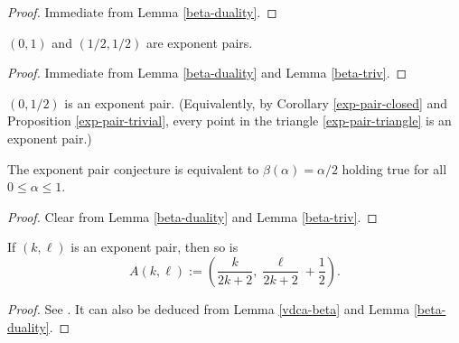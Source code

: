 \begin{proof} Immediate from Lemma \ref{beta-duality}.
\end{proof}

\begin{proposition}\label{exp-pair-trivial}
$(0,1)$ and $(1/2,1/2)$ are exponent pairs.
\end{proposition}


\begin{proof} Immediate from Lemma \ref{beta-duality} and Lemma \ref{beta-triv}.
\end{proof}

\begin{conjecture}\label{exp-pair-conj}
$(0,1/2)$ is an exponent pair.  (Equivalently, by Corollary \ref{exp-pair-closed} and Proposition \ref{exp-pair-trivial}, every point in the triangle \eqref{exp-pair-triangle} is an exponent pair.)
\end{conjecture}



\begin{lemma}\label{exp-pair-conj-beta}
\leanok
The exponent pair conjecture is equivalent to $\beta(\alpha)=\alpha/2$ holding true for all $0 \leq \alpha \leq 1$.
\end{lemma}

\begin{proof} Clear from Lemma \ref{beta-duality} and Lemma \ref{beta-triv}.
\end{proof}

\begin{proposition}\label{vdc-a}
\leanok
If $(k,\ell)$ is an exponent pair, then so is
    $$A(k,\ell) := \left(\frac{k}{2k+2}, \frac{\ell}{2k+2} + \frac{1}{2}\right).$$
\end{proposition}

\literature
{}

\begin{proof}\leanok See \cite[Lemma 2.8]{ivic}. It can also be deduced from Lemma \ref{vdca-beta} and Lemma \ref{beta-duality}.
\end{proof}

